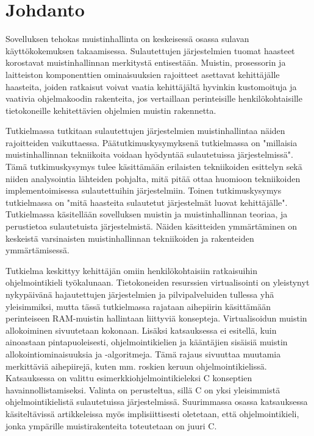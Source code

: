 \chapter{Johdanto} \label{Johdanto}

Sovelluksen tehokas muistinhallinta on keskeisessä osassa sulavan käyttökokemuksen takaamisessa. Sulautettujen järjestelmien tuomat haasteet korostavat muistinhallinnan merkitystä entisestään. Muistin, prosessorin ja laitteiston komponenttien ominaisuuksien rajoitteet asettavat kehittäjälle haasteita, joiden ratkaisut voivat vaatia kehittäjältä hyvinkin kustomoituja ja vaativia ohjelmakoodin rakenteita, jos vertaillaan perinteisille henkilökohtaisille tietokoneille kehitettävien ohjelmien muistin rakennetta.

Tutkielmassa tutkitaan sulautettujen järjestelmien muistinhallintaa näiden rajoitteiden vaikuttaessa. Päätutkimuskysymyksenä tutkielmassa on "millaisia muistinhallinnan tekniikoita voidaan hyödyntää sulautetuissa järjestelmissä". Tämä tutkimuskysymys tulee käsittämään erilaisten tekniikoiden esittelyn sekä niiden analysointia lähteiden pohjalta, mitä pitää ottaa huomioon tekniikoiden implementoimisessa sulautettuihin järjestelmiin. Toinen tutkimuskysymys tutkielmassa on "mitä haasteita sulautetut järjestelmät luovat kehittäjälle". Tutkielmassa käsitellään sovelluksen muistin ja muistinhallinnan teoriaa, ja perustietoa sulautetuista järjestelmistä. Näiden käsitteiden ymmärtäminen on keskeistä varsinaisten muistinhallinnan tekniikoiden ja rakenteiden ymmärtämisessä.

Tutkielma keskittyy kehittäjän omiin henkilökohtaisiin ratkaisuihin ohjelmointikieli työkalunaan. Tietokoneiden resurssien virtualisointi on yleistynyt nykypäivänä hajautettujen järjestelmien ja pilvipalveluiden tullessa yhä yleisimmiksi, mutta tässä tutkielmassa rajataan aihepiirin käsittämään perinteiseen RAM-muistin hallintaan liittyviä konsepteja. Virtualisoidun muistin allokoiminen sivuutetaan kokonaan. Lisäksi katsauksessa ei esitellä, kuin ainoastaan pintapuoleisesti, ohjelmointikielien ja kääntäjien sisäisiä muistin allokointiominaisuuksia ja -algoritmeja. Tämä rajaus sivuuttaa muutamia merkittäviä aihepiirejä, kuten mm. roskien keruun ohjelmointikielissä. Katsauksessa on valittu esimerkkiohjelmointikieleksi C konseptien havainnollistamiseksi. Valinta on perusteltua, sillä C on yksi yleisimmistä ohjelmointikielistä sulautetuissa järjestelmissä. Suurimmassa osassa katsauksessa käsiteltävissä artikkeleissa myös implisiittisesti oletetaan, että ohjelmointikieli, jonka ympärille muistirakenteita toteutetaan on juuri C.

